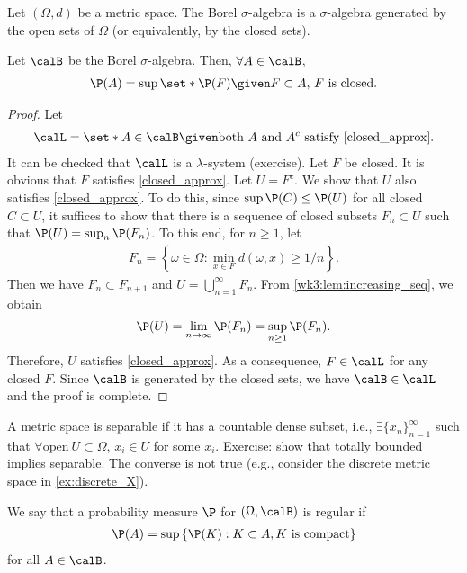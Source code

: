 \documentclass[../aipt.tex]{subfiles}
\begin{document}
\begin{Definition} \label{Defns:Borel_sigma_algebra}
Let $(\Omega, d)$ be a metric space. The Borel $\sigma$-algebra is a $\sigma$-algebra generated by the open sets of $\Omega$ (or equivalently, by the closed sets).
\end{Definition}
%
\begin{Lemma}\label{wk3:lem:closed_approx}
Let $\calB$ be the Borel $\sigma$-algebra. Then, $\forall A \in \calB$,
\begin{align} \label{closed_approx}
\P(A) = \sup \set*{ \P(F) \given F \subset A,\, F\ \text{is closed}}.
\end{align}
\end{Lemma}
\begin{proof}
Let
\begin{align*}
\calL = \set*{A \in \calB \given \text{both $A$ and $A^c$ satisfy \cref{closed_approx}}}.
\end{align*} 
It can be checked that $\calL$ is a $\lambda$-system (exercise). Let $F$ be closed. It is obvious that $F$ satisfies \cref{closed_approx}. Let $U = F^c$. We show that $U$ also satisfies \cref{closed_approx}. To do this, since $\sup \P(C) \leq \P(U)$ for all closed $C\subset U$, it suffices to show that there is a sequence of closed subsets $F_n\subset U$ such that $\P(U)=\sup_n \P(F_n)$. To this end, for $n\geq 1$, let
\begin{align*}
F_n = \left\{\omega \in \Omega: \min\limits_{x \in F}d(\omega, x) \geq 1/n \right\}.
\end{align*}
Then we have $F_n \subset F_{n+1}$ and $U = \bigcup\limits_{n=1}^{\infty} F_n$. From \cref{wk3:lem:increasing_seq}, we obtain
\begin{align*}
\P(U) = \lim_{n \to \infty} \P(F_n) = \sup\limits_{n \geq 1} \P(F_n).
\end{align*}
Therefore, $U$ satisfies \cref{closed_approx}. As a consequence, $F \in \calL$ for any closed $F$. Since $\calB$ is generated by the closed sets, we have $\calB \in \calL$ and the proof is complete.
\end{proof}

A metric space is separable if it has a countable dense subset, i.e., $\exists \{x_n\}_{n=1}^{\infty}$ such that $\forall \text{open}\ U \subset \Omega$, $x_i \in U$ for some $x_i$. Exercise: show that totally bounded implies separable. The converse is not true (e.g., consider the discrete metric space in \cref{ex:discrete_X}). 

\begin{Definition}\label{wk3:def:regular}
We say that a probability measure $\P$ for $(\Omega,\calB)$ is regular if
\begin{align*}
\P(A) = \sup\left\{\P(K): K \subset A, K\ \text{is compact}\right\}
\end{align*}
for all $A\in\calB$.
\end{Definition}
\end{document}
